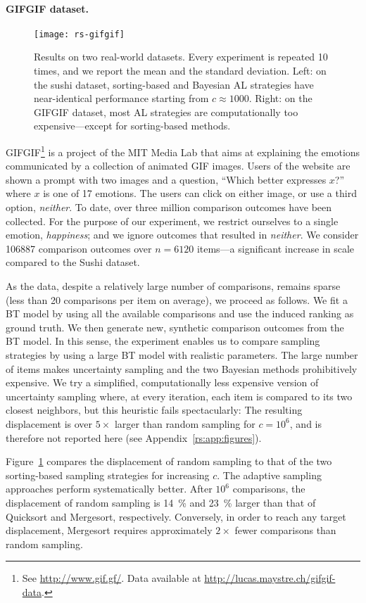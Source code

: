 \paragraph{GIFGIF dataset.}

\begin{figure}[t]
\centering
\texttt{[image: rs-gifgif]}
\caption{
Results on two real-world datasets.
Every experiment is repeated \num{10} times, and we report the mean and the standard deviation.
Left: on the sushi dataset, sorting-based and Bayesian AL strategies have near-identical performance starting from $c \approx \num{1000}$.
Right: on the GIFGIF dataset, most AL strategies are computationally too expensive---except for sorting-based methods.
}
\label{rs:fig:gifgif}
\end{figure}

GIFGIF\footnote{See \url{http://www.gif.gf/}.
Data available at \url{http://lucas.maystre.ch/gifgif-data}.} is a project of the MIT Media Lab that aims at explaining the emotions communicated by a collection of animated GIF images.
Users of the website are shown a prompt with two images and a question, ``Which better expresses $x$?'' where $x$ is one of 17 emotions.
The users can click on either image, or use a third option, \emph{neither}.
To date, over three million comparison outcomes have been collected.
For the purpose of our experiment, we restrict ourselves to a single emotion, \emph{happiness}; and we ignore outcomes that resulted in \emph{neither}.
We consider \num{106887} comparison outcomes over $n = \num{6120}$ items---a significant increase in scale compared to the Sushi dataset.

As the data, despite a relatively large number of comparisons, remains sparse (less than 20 comparisons per item on average), we proceed as follows.
We fit a BT model by using all the available comparisons and use the induced ranking as ground truth.
We then generate new, synthetic comparison outcomes from the BT model.
In this sense, the experiment enables us to compare sampling strategies by using a large BT model with realistic parameters.
The large number of items makes uncertainty sampling and the two Bayesian methods prohibitively expensive.
We try a simplified, computationally less expensive version of uncertainty sampling where, at every iteration, each item is compared to its two closest neighbors, but this heuristic fails spectacularly: The resulting displacement is over $5\times$ larger than random sampling for $c = 10^6$, and is therefore not reported here (see Appendix~\ref{rs:app:figures}).

Figure~\ref{rs:fig:gifgif} compares the displacement of random sampling to that of the two sorting-based sampling strategies for increasing $c$.
The adaptive sampling approaches perform systematically better.
After $10^6$ comparisons, the displacement of random sampling is \num{14}~\% and \num{23}~\% larger than that of Quicksort and Mergesort, respectively.
Conversely, in order to reach any target displacement, Mergesort requires approximately $2 \times$ fewer comparisons than random sampling.
